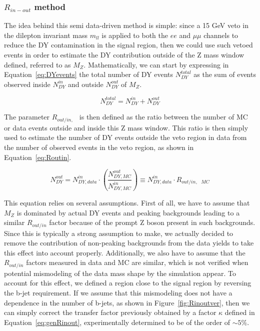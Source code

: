 \documentclass[a4paper, 10pt, openright]{report}
\begin{document}
\subsubsection{\boldmath$R_{in-out}$ method} \label{subsection:rinout}

The idea behind this semi data-driven method is simple: since a 15 GeV veto in the dilepton invariant mass $m_{ll}$ is applied to both the $ee$ and $\mu \mu$ channels to reduce the \ac{DY} contamination in the signal region, then we could use such vetoed events in order to estimate the \ac{DY} contribution outside of the Z mass window defined, referred to as $M_Z$. Mathematically, we can start by expressing in Equation~\ref{eq:DYevents} the total number of \ac{DY} events $N_{DY}^{total}$ as the sum of events observed inside $N_{DY}^{in}$ and outside $N_{DY}^{out}$ of $M_Z$.

\begin{equation}
\label{eq:DYevents}
N_{DY}^{total} = N_{DY}^{in} + N_{DY}^{out}
\end{equation}

The parameter $R_{out/in,\text{ }}$ is then defined as the ratio between the number of \ac{MC} or data events outside and inside this Z mass window. This ratio is then simply used to estimate the number of DY events outside the veto region in data from the number of observed events in the veto region, as shown in Equation~\ref{eq:Routin}.

\begin{equation}
\label{eq:Routin}
N^{out}_{DY} = N^{in}_{DY, data} \cdot \left (\frac{N^{out}_{DY, MC}}{N^{in}_{DY, MC}} \right ) \equiv  N^{in}_{DY, data} \cdot R_{out/in,\text{ } MC}
\end{equation}

This equation relies on several assumptions. First of all, we have to assume that $M_Z$ is dominated by actual \ac{DY} events and peaking backgrounds leading to a similar $R_{out/in}$ factor because of the prompt Z boson present in such backgrounds. Since this is typically a strong assumption to make, we actually decided to remove the contribution of non-peaking backgrounds from the data yields to take this effect into account properly. Additionally, we also have to assume that the $R_{out/in}$ factors measured in data and \ac{MC} are similar, which is not verified when potential mismodeling of the data mass shape by the simulation appear. To account for this effect, we defined a region close to the signal region by reversing the b-jet requirement. If we assume that this mismodeling does not have a dependence in the number of b-jets, as shown in Figure~\ref{fig:Rinoutver}, then we can simply correct the transfer factor previously obtained by a factor $\kappa$ defined in Equation~\ref{eq:genRinout}, experimentally determined to be of the order of $\sim 5\%$.%
\end{document}
